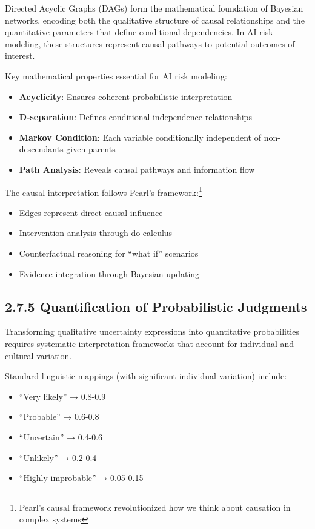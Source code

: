 \documentclass[
  11pt,
  letterpaper,
]{book}
\providecommand{\tightlist}{%
  \setlength{\itemsep}{0pt}\setlength{\parskip}{0pt}}
\begin{document}
Directed Acyclic Graphs (DAGs) form the mathematical foundation of
Bayesian networks, encoding both the qualitative structure of causal
relationships and the quantitative parameters that define conditional
dependencies. In AI risk modeling, these structures represent causal
pathways to potential outcomes of interest.

Key mathematical properties essential for AI risk modeling:

\begin{itemize}
\tightlist
\item
  \textbf{Acyclicity}: Ensures coherent probabilistic interpretation
\item
  \textbf{D-separation}: Defines conditional independence relationships
\item
  \textbf{Markov Condition}: Each variable conditionally independent of
  non-descendants given parents
\item
  \textbf{Path Analysis}: Reveals causal pathways and information flow
\end{itemize}

The causal interpretation follows Pearl's framework:\footnote{Pearl's
  causal framework revolutionized how we think about causation in
  complex systems}

\begin{itemize}
\tightlist
\item
  Edges represent direct causal influence
\item
  Intervention analysis through do-calculus
\item
  Counterfactual reasoning for ``what if'' scenarios
\item
  Evidence integration through Bayesian updating
\end{itemize}

\subsection*{2.7.5 Quantification of Probabilistic
Judgments}\label{sec-quantification}

Transforming qualitative uncertainty expressions into quantitative
probabilities requires systematic interpretation frameworks that account
for individual and cultural variation.

Standard linguistic mappings (with significant individual variation)
include:

\begin{itemize}
\tightlist
\item
  ``Very likely'' → 0.8-0.9
\item
  ``Probable'' → 0.6-0.8
\item
  ``Uncertain'' → 0.4-0.6
\item
  ``Unlikely'' → 0.2-0.4
\item
  ``Highly improbable'' → 0.05-0.15
\end{itemize}
\end{document}
